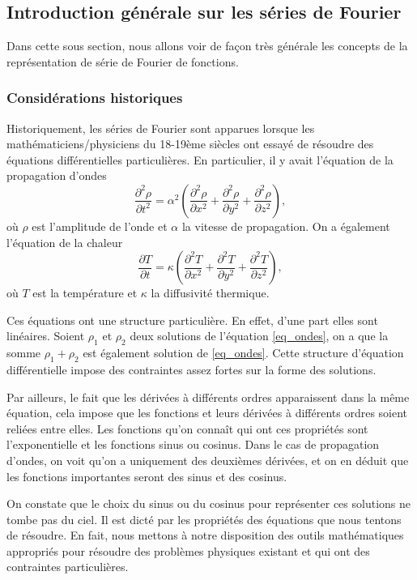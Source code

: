 \documentclass[a4paper,12pt]{book}
\newcommand{\pDeriv}[2]{\frac{\partial #1}{\partial #2}}
\newcommand{\pDerivTwo}[2]{\frac{\partial^2 #1}{\partial #2^2}}
\begin{document}
\subsection{Introduction générale sur les séries de Fourier}

Dans cette sous section, nous allons voir de façon très générale les concepts 
de la représentation de série de Fourier de fonctions.

\subsubsection{Considérations historiques}

Historiquement, les séries de Fourier sont apparues lorsque les mathématiciens/physiciens 
du 18-19ème siècles ont essayé de résoudre des équations différentielles particulières. 
En particulier, il y avait l'équation de la propagation d'ondes
\begin{equation}
 \pDerivTwo{\rho}{t}=\alpha^2\left(\pDerivTwo{\rho}{x}+\pDerivTwo{\rho}{y}+\pDerivTwo{\rho}{z}\right),\label{eq_ondes}
\end{equation}
où $\rho$ est l'amplitude de l'onde et $\alpha$ la vitesse de propagation.
On a également l'équation de la chaleur 
\begin{equation}
 \pDeriv{T}{t}=\kappa\left(\pDerivTwo{T}{x}+\pDerivTwo{T}{y}+\pDerivTwo{T}{z}\right),
\end{equation}
où $T$ est la température et $\kappa$ la diffusivité thermique.

Ces équations ont une structure particulière. En effet, d'une part elles sont linéaires. Soient $\rho_1$ et $\rho_2$
deux solutions de l'équation \eqref{eq_ondes}, on a que la somme $\rho_1+\rho_2$ est également solution de \eqref{eq_ondes}.
Cette structure d'équation différentielle impose des contraintes assez fortes sur la forme des solutions.

Par ailleurs, le fait que les dérivées à différents ordres apparaissent dans la même équation, cela impose 
que les fonctions et leurs dérivées à différents ordres soient reliées entre elles. Les fonctions qu'on connaît
qui ont ces propriétés sont l'exponentielle et les fonctions sinus ou cosinus.
Dans le cas de propagation d'ondes, on voit qu'on a uniquement des deuxièmes dérivées, et on en déduit
que les fonctions importantes seront des sinus et des cosinus.

On constate que le choix du sinus ou du cosinus pour représenter ces solutions ne tombe pas du ciel.
Il est dicté par les propriétés des équations que nous tentons de résoudre. En fait, nous mettons à 
notre disposition des outils mathématiques appropriés pour résoudre des problèmes physiques
existant et qui ont des contraintes particulières.
\end{document}
